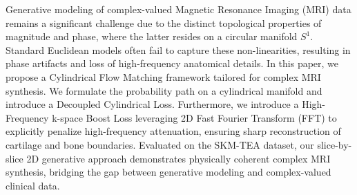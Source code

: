 Generative modeling of complex-valued Magnetic Resonance Imaging (MRI) data remains a significant challenge due to the distinct topological properties of magnitude and phase, where the latter resides on a circular manifold $S^1$. Standard Euclidean models often fail to capture these non-linearities, resulting in phase artifacts and loss of high-frequency anatomical details. In this paper, we propose a Cylindrical Flow Matching framework tailored for complex MRI synthesis. We formulate the probability path on a cylindrical manifold and introduce a Decoupled Cylindrical Loss. Furthermore, we introduce a High-Frequency k-space Boost Loss leveraging 2D Fast Fourier Transform (FFT) to explicitly penalize high-frequency attenuation, ensuring sharp reconstruction of cartilage and bone boundaries. Evaluated on the SKM-TEA dataset, our slice-by-slice 2D generative approach demonstrates physically coherent complex MRI synthesis, bridging the gap between generative modeling and complex-valued clinical data.